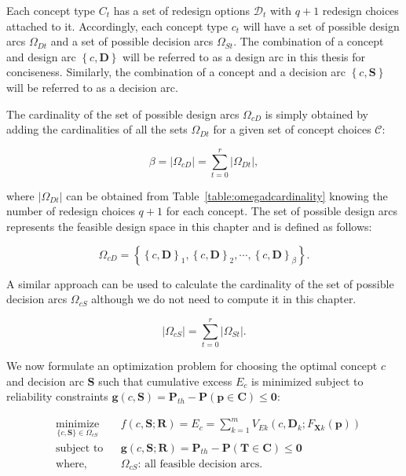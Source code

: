 Each concept type $C_t$ has a set of redesign options $\mathcal{D}_t$ with $q+1$ redesign choices attached to it. Accordingly, each concept type $c_t$ will have a set of possible design arcs $\Omega_{Dt}$ and a set of possible decision arcs $\Omega_{St}$. The combination of a concept and design arc $\left\{c,\mathbf{D}\right\}$ will be referred to as a design arc in this thesis for conciseness. Similarly, the combination of a concept and a decision arc $\left\{c,\mathbf{S}\right\}$ will be referred to as a decision arc.

The cardinality of the set of possible design arcs $\Omega_{cD}$ is simply obtained by adding the cardinalities of all the sets $\Omega_{Dt}$ for a given set of concept choices $\mathcal{C}$:

\begin{equation} \label{eq:cardinailitycdarc}
	\beta = |\Omega_{cD}| = \sum\limits_{t=0}^{r} |\Omega_{Dt}|,
\end{equation}

where $|\Omega_{Dt}|$ can be obtained from Table~\ref{table:omegadcardinality} knowing the number of redesign choices $q+1$ for each concept. The set of possible design arcs represents the feasible design space in this chapter and is defined as follows:

\begin{equation} \label{eq:feasibledesignset}
	\Omega_{cD} = \left\{\left\{c,\mathbf{D}\right\}_1,\left\{c,\mathbf{D}\right\}_2,\cdots,\left\{c,\mathbf{D}\right\}_\beta\right\}.
\end{equation}

A similar approach can be used to calculate the cardinality of the set of possible decision arcs $\Omega_{cS}$ although we do not need to compute it in this chapter.

\begin{equation} \label{eq:cardinailitycsarc}
	|\Omega_{cS}| = \sum\limits_{t=0}^{r} |\Omega_{St}|.
\end{equation}

We now formulate an optimization problem for choosing the optimal concept $c$ and decision arc $\mathbf{S}$ such that cumulative excess $E_c$ is minimized subject to reliability constraints $\mathbf{g}(c,\mathbf{S}) = \mathbf{P}_{th} - \mathbf{P}(\mathbf{p} \in \mathbf{C}) \le \mathbf{0}$:

\begin{equation}
	\label{eq:TSEoptproblem}
	\begin{aligned}
		& \underset{\{c,\mathbf{S}\}\in\Omega_{cS}}{\text{minimize}}
		& & {f}(c,\mathbf{S};\mathbf{R}) = E_c = \sum\limits_{k=1}^{m} V_{Ek}(c,\mathbf{D}_k;F_{\mathbf{X}k}(\mathbf{p}))\\
		& \text{subject to}
		& & \mathbf{g}(c,\mathbf{S};\mathbf{R}) = \mathbf{P}_{th} - \mathbf{P}(\mathbf{T} \in \mathbf{C}) \le \mathbf{0}\\
		& \text{where,}
		& & \Omega_{cS}\text{: all feasible decision arcs}.\\
	\end{aligned}
\end{equation}

